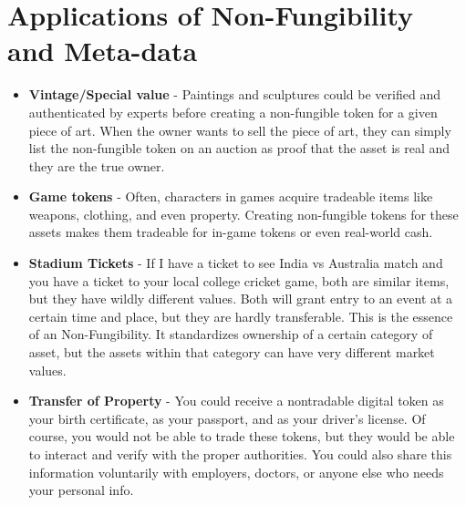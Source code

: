\documentclass[10pt,a4paper]{article}
\begin{document}
\section{Applications of Non-Fungibility and Meta-data}
\begin{itemize}
    \item \textbf{Vintage/Special value} - Paintings and sculptures could be verified and authenticated by experts before creating a non-fungible token for a given piece of art. When the owner wants to sell the piece of art, they can simply list the non-fungible token on an auction as proof that the asset is real and they are the true owner.
    \item \textbf{Game tokens} - Often, characters in games acquire tradeable items like weapons, clothing, and even property. Creating non-fungible tokens for these assets makes them tradeable for in-game tokens or even real-world cash. 
    \item \textbf{Stadium Tickets} - If I have a ticket to see India vs Australia match and you have a ticket to your local college cricket game, both are similar items, but they have wildly different values. Both will grant entry to an event at a certain time and place, but they are hardly transferable. This is the essence of an Non-Fungibility. It standardizes ownership of a certain category of asset, but the assets within that category can have very different market values.
    \item \textbf{Transfer of Property} - You could receive a nontradable digital token as your birth certificate, as your passport, and as your driver’s license. Of course, you would not be able to trade these tokens, but they would be able to interact and verify with the proper authorities. You could also share this information voluntarily with employers, doctors, or anyone else who needs your personal info.
\end{itemize}
\end{document}
